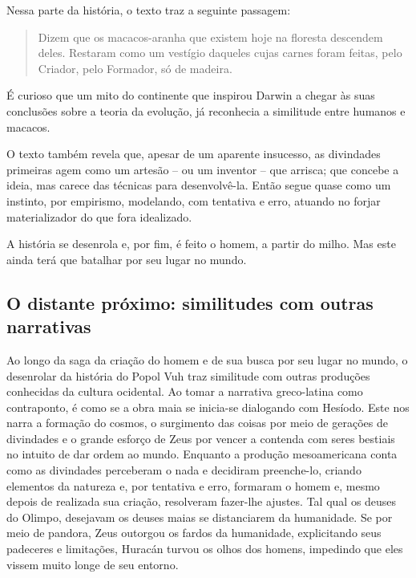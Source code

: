 \documentclass[12pt]{extarticle}
\begin{document}
Nessa parte da história, o texto traz a seguinte passagem:

\begin{quote}
Dizem que os macacos-aranha que existem hoje na floresta descendem
deles. Restaram como um vestígio daqueles cujas carnes foram feitas,
pelo Criador, pelo Formador, só de madeira.
\end{quote}

É curioso que um mito do continente que inspirou Darwin a chegar às suas
conclusões sobre a teoria da evolução, já reconhecia a similitude entre
humanos e macacos.

O texto também revela que, apesar de um aparente insucesso, as
divindades primeiras agem como um artesão -- ou um inventor -- que
arrisca; que concebe a ideia, mas carece das técnicas para
desenvolvê-la. Então segue quase como um instinto, por empirismo,
modelando, com tentativa e erro, atuando no forjar materializador do que
fora idealizado.

A história se desenrola e, por fim, é feito o homem, a partir do milho.
Mas este ainda terá que batalhar por seu lugar no mundo.





\subsection{O distante próximo: similitudes com outras narrativas}

Ao longo da saga da criação do homem e de sua busca por seu lugar no
mundo, o desenrolar da história do Popol Vuh traz similitude com outras
produções conhecidas da cultura ocidental. Ao tomar a narrativa
greco-latina como contraponto, é como se a obra maia se inicia-se
dialogando com Hesíodo. Este nos narra a formação do cosmos, o
surgimento das coisas por meio de gerações de divindades e o grande
esforço de Zeus por vencer a contenda com seres bestiais no intuito de
dar ordem ao mundo. Enquanto a produção mesoamericana conta como as
divindades perceberam o nada e decidiram preenche-lo, criando elementos
da natureza e, por tentativa e erro, formaram o homem e, mesmo depois de
realizada sua criação, resolveram fazer-lhe ajustes. Tal qual os deuses
do Olimpo, desejavam os deuses maias se distanciarem da humanidade. Se
por meio de pandora, Zeus outorgou os fardos da humanidade, explicitando
seus padeceres e limitações, Huracán turvou os olhos dos homens,
impedindo que eles vissem muito longe de seu entorno.
\end{document}
